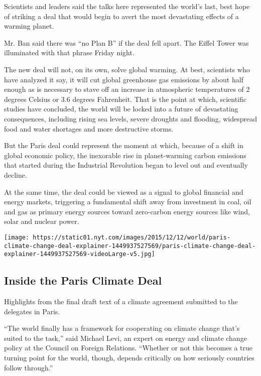 Scientists and leaders said the talks here represented the world's last,
best hope of striking a deal that would begin to avert the most
devastating effects of a warming planet.

Mr. Ban said there was ``no Plan B'' if the deal fell apart. The Eiffel
Tower was illuminated with that phrase Friday night.

The new deal will not, on its own, solve global warming. At best,
scientists who have analyzed it say, it will cut global greenhouse gas
emissions by about half enough as is necessary to stave off an increase
in atmospheric temperatures of 2 degrees Celsius or 3.6 degrees
Fahrenheit. That is the point at which, scientific studies have
concluded, the world will be locked into a future of devastating
consequences, including rising sea levels, severe droughts and flooding,
widespread food and water shortages and more destructive storms.

But the Paris deal could represent the moment at which, because of a
shift in global economic policy, the inexorable rise in planet-warming
carbon emissions that started during the Industrial Revolution began to
level out and eventually decline.

At the same time, the deal could be viewed as a signal to global
financial and energy markets, triggering a fundamental shift away from
investment in coal, oil and gas as primary energy sources toward
zero-carbon energy sources like wind, solar and nuclear power.

\href{https://www.nytimes.com/interactive/2015/12/12/world/paris-climate-change-deal-explainer.html}{}

\texttt{[image: https://static01.nyt.com/images/2015/12/12/world/paris-climate-change-deal-explainer-1449937527569/paris-climate-change-deal-explainer-1449937527569-videoLarge-v5.jpg]}

\hypertarget{inside-the-paris-climate-deal}{%
\subsection{Inside the Paris Climate
Deal}\label{inside-the-paris-climate-deal}}

Highlights from the final draft text of a climate agreement submitted to
the delegates in Paris.

``The world finally has a framework for cooperating on climate change
that's suited to the task,'' said Michael Levi, an expert on energy and
climate change policy at the Council on Foreign Relations. ``Whether or
not this becomes a true turning point for the world, though, depends
critically on how seriously countries follow through.''

